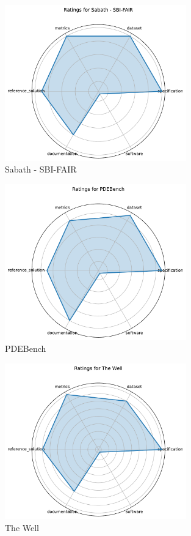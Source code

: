 \documentclass{article}
\begin{document}
\begin{figure}[h!]
  \centering
  \includegraphics[width=0.7\textwidth]{Sabath - SBI-FAIR_radar.pdf}
  \caption{Sabath - SBI-FAIR}
\end{figure}

\begin{figure}[h!]
  \centering
  \includegraphics[width=0.7\textwidth]{PDEBench_radar.pdf}
  \caption{PDEBench}
\end{figure}

\begin{figure}[h!]
  \centering
  \includegraphics[width=0.7\textwidth]{The Well_radar.pdf}
  \caption{The Well}
\end{figure}
\end{document}
